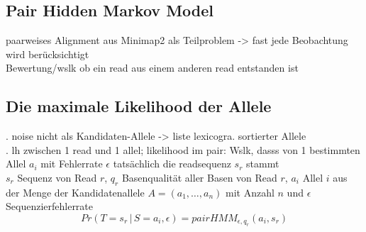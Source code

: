 \subsection{Pair Hidden Markov Model} \label{subsec:sol_phmm}
paarweises Alignment aus Minimap2 als Teilproblem -> fast jede Beobachtung wird berücksichtigt\\
Bewertung/wslk ob ein read aus einem anderen read entstanden ist\\
\subsection{Die maximale Likelihood der Allele} \label{subsec:sol_allele_lh}
. noise nicht als Kandidaten-Allele -> liste lexicogra. sortierter Allele\\

. lh zwischen 1 read und 1 allel; likelihood im pair: Wslk, dasss von 1 bestimmten Allel $a_{i}$ mit Fehlerrate $\epsilon$ tatsächlich die readsequenz $s_{r}$ stammt \\
$s_{r}$ Sequenz von Read $r$, $q_{r}$ Basenqualität aller Basen von Read $r$, $a_{i}$ Allel $i$ aus der Menge der Kandidatenallele $A=(a_{1},\dots, a_{n})$ mit Anzahl $n$ und $\epsilon$ Sequenzierfehlerrate
\begin{equation} \label{eqn:2-xxx1}
\tag{2-xxx1}
Pr(T=s_{r} \, | \, S=a_{i}, \epsilon) = pairHMM_{\epsilon,q_{r}}(a_{i}, s_{r})
\end{equation}

